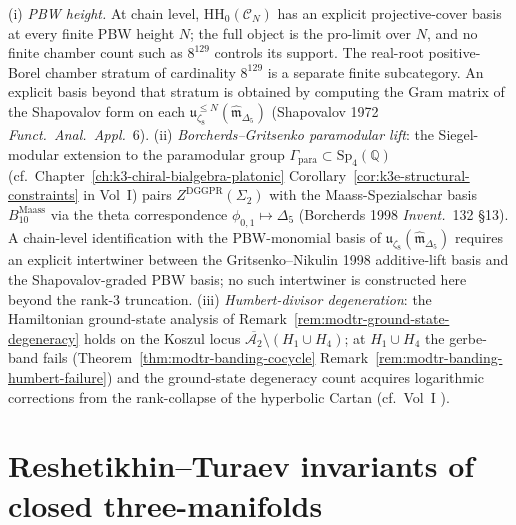 \begin{remark}
\label{rem:modtr-open-directions}
(i) \emph{PBW height.} At chain level, \(\mathrm{HH}_0(\mathcal C_N)\) has an explicit
projective-cover basis at every finite PBW height \(N\); the full
object is the pro-limit over \(N\), and no finite chamber count such as
\(8^{129}\) controls its support.  The real-root positive-Borel chamber
stratum of cardinality \(8^{129}\) is a separate finite subcategory. An explicit basis beyond
that stratum is obtained by computing the Gram matrix of the Shapovalov
form on each \(\mathfrak u_{\zeta_8}^{\leq N}
(\widehat{\mathfrak m}_{\Delta_5})\) (Shapovalov 1972
\emph{Funct.~Anal.~Appl.}~6).
(ii) \emph{Borcherds--Gritsenko paramodular lift}: the Siegel-modular extension to the
paramodular group $\Gamma_{\mathrm{para}}\subset\mathrm{Sp}_4(\mathbb Q)$
(cf.\ Chapter~\ref{ch:k3-chiral-bialgebra-platonic}
Corollary~\ref{cor:k3e-structural-constraints} in Vol~I) pairs
$Z^{\mathrm{DGGPR}}(\Sigma_2)$ with the Maass-Spezialschar basis
${B_{10}^{\mathrm{Maass}}}$ via the theta correspondence
$\phi_{0,1}\mapsto\Delta_5$ (Borcherds 1998 \emph{Invent.}~132
\S 13). A chain-level identification with the PBW-monomial basis of
$\mathfrak u_{\zeta_8}(\widehat{\mathfrak m}_{\Delta_5})$ requires an
explicit intertwiner between the Gritsenko--Nikulin 1998 additive-lift
basis and the Shapovalov-graded PBW basis; no such intertwiner is
constructed here beyond the rank-3 truncation.
(iii) \emph{Humbert-divisor degeneration}: the Hamiltonian
ground-state analysis of Remark~\ref{rem:modtr-ground-state-degeneracy}
holds on the Koszul locus
$\overline{\mathcal A_2}\setminus(H_1\cup H_4)$; at $H_1\cup H_4$ the
gerbe-band fails
(Theorem~\ref{thm:modtr-banding-cocycle}
Remark~\ref{rem:modtr-banding-humbert-failure}) and the ground-state
degeneracy count acquires logarithmic corrections from the rank-collapse
of the hyperbolic Cartan (cf.\ Vol~I
\cite{VolI}).
\end{remark}

\section{Reshetikhin--Turaev invariants of closed three-manifolds}
\label{sec:modtr-rt-closed-3manifolds}

